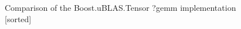 \begin{figure}[htb]
    \centering
    \caption*{Comparison of the Boost.uBLAS.Tensor ?gemm implementation [sorted]}
    \label{fig:mtm_col_Sspeedup_per220}
    \qquad
    \label{fig:mtm_col_Dspeedup_per220}
\end{figure}

